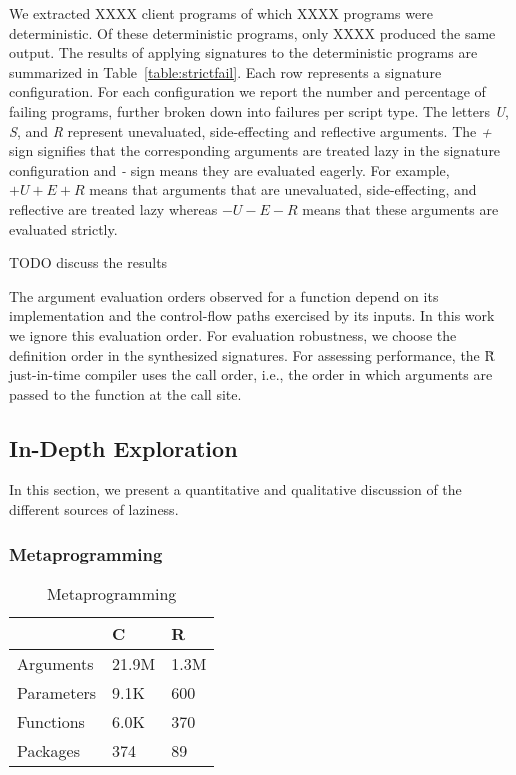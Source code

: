 \documentclass[review,nonacm,screen,acmsmall,anonymous=true]{acmart}
\newcommand{\authorcomment}[3]{}
\newcommand{\AG}[1]{\authorcomment{orange}{AG}{#1}}
\renewcommand{\Rsh}{{\sf\u R}\xspace}
\begin{document}
We extracted XXXX client programs of which XXXX programs were deterministic. Of
these deterministic programs, only XXXX produced the same output. The results of
applying signatures to the deterministic programs are summarized in
Table~\ref{table:strictfail}. Each row represents a signature configuration. For
each configuration we report the number and percentage of failing programs,
further broken down into failures per script type. The letters \emph{U},
\emph{S}, and \emph{R} represent unevaluated, side-effecting and reflective
arguments. The \emph{+} sign signifies that the corresponding arguments are
treated lazy in the signature configuration and \emph{-} sign means they are
evaluated eagerly. For example, $+U+E+R$ means that arguments that are
unevaluated, side-effecting, and reflective are treated lazy whereas $-U-E-R$
means that these arguments are evaluated strictly.






TODO discuss the results

The argument evaluation orders observed for a function depend on its
implementation and the control-flow paths exercised by its inputs. In this work
we ignore this evaluation order. For evaluation robustness, we choose the
definition order in the synthesized signatures. For assessing performance, the
\Rsh just-in-time compiler uses the call order, i.e., the order in which
arguments are passed to the function at the call site.


\AG{Threats to validity: rlang has defiintion of SEXP.}


\subsection{In-Depth Exploration}\label{sec:lazr-discussion}

In this section, we present a quantitative and qualitative discussion of the
different sources of laziness.

\subsubsection{Metaprogramming}

\begin{wraptable}{r}{4cm}
  \vspace{-3mm}
  \small
  \caption{Metaprogramming} \label{table:meta}
  \centering
  \begin{tabular}{lll}
    \toprule
    &\textbf{C}&\textbf{R}\\
    \midrule
    Arguments&21.9M&1.3M\\
    Parameters&9.1K&600\\
    Functions&6.0K&370\\
    Packages&374&89\\
    \bottomrule
  \end{tabular}
\end{wraptable}
\end{document}
